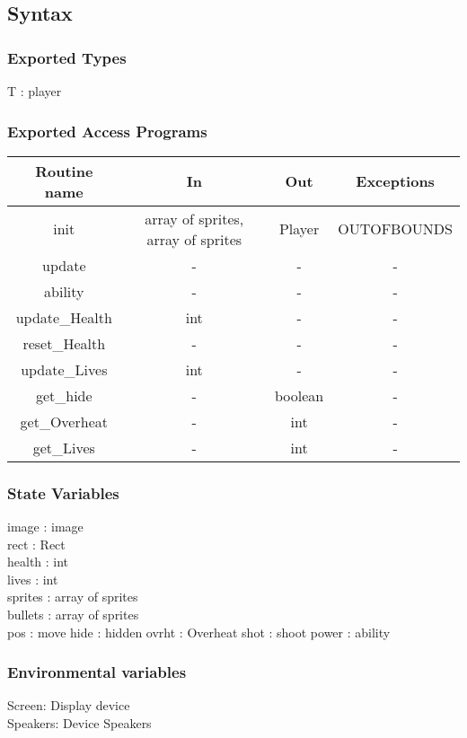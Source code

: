 \documentclass[12pt, titlepage]{article}
\begin{document}
\subsection{Syntax}
\subsubsection {Exported Types}
T : player

\subsubsection{Exported Access Programs}

\begin{tabular}{| c | c | c | c |}
\hline
\textbf{Routine name} & \textbf{In} & \textbf{Out} & \textbf{Exceptions}\\
\hline
init & array of sprites, array of sprites & Player & OUTOFBOUNDS  \\
\hline
update & - & - & -\\
\hline
ability & - & - & -\\
\hline 
update\_Health & int & - & -\\
\hline
reset\_Health & - & - & -\\
\hline
update\_Lives & int & - & -\\
\hline
get\_hide & - & boolean & -\\
\hline
get\_Overheat & - & int & -\\
\hline
get\_Lives & - & int & -\\
\hline

\end{tabular}

\subsubsection {State Variables}
image : image\\
rect : Rect\\
health : int\\
lives : int\\
sprites : array of sprites\\
bullets : array of sprites\\
pos : move
hide : hidden
ovrht : Overheat
shot : shoot
power : ability

\subsubsection {Environmental variables}
Screen: Display device\\
Speakers: Device Speakers
\end{document}
